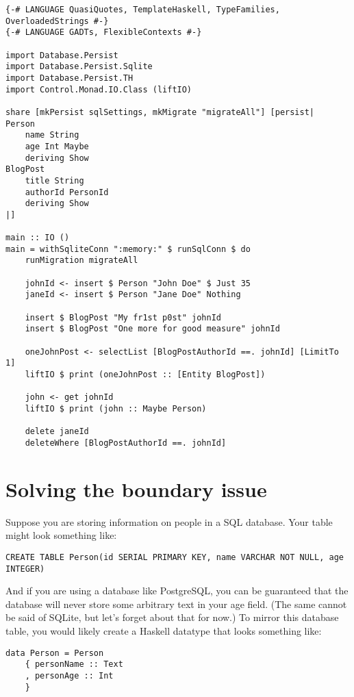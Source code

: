 \begin{lstlisting}
{-# LANGUAGE QuasiQuotes, TemplateHaskell, TypeFamilies, OverloadedStrings #-}
{-# LANGUAGE GADTs, FlexibleContexts #-}

import Database.Persist
import Database.Persist.Sqlite
import Database.Persist.TH
import Control.Monad.IO.Class (liftIO)

share [mkPersist sqlSettings, mkMigrate "migrateAll"] [persist|
Person
    name String
    age Int Maybe
    deriving Show
BlogPost
    title String
    authorId PersonId
    deriving Show
|]

main :: IO ()
main = withSqliteConn ":memory:" $ runSqlConn $ do
    runMigration migrateAll

    johnId <- insert $ Person "John Doe" $ Just 35
    janeId <- insert $ Person "Jane Doe" Nothing

    insert $ BlogPost "My fr1st p0st" johnId
    insert $ BlogPost "One more for good measure" johnId

    oneJohnPost <- selectList [BlogPostAuthorId ==. johnId] [LimitTo 1]
    liftIO $ print (oneJohnPost :: [Entity BlogPost])

    john <- get johnId
    liftIO $ print (john :: Maybe Person)

    delete janeId
    deleteWhere [BlogPostAuthorId ==. johnId]
\end{lstlisting}

\section{Solving the boundary issue}

Suppose you are storing information on people in a SQL database. Your table might look something like:

\begin{lstlisting}
CREATE TABLE Person(id SERIAL PRIMARY KEY, name VARCHAR NOT NULL, age INTEGER)
\end{lstlisting}

And if you are using a database like PostgreSQL, you can be guaranteed that the database will never store some arbitrary text in your age field. (The same cannot be said of SQLite, but let's forget about that for now.) To mirror this database table, you would likely create a Haskell datatype that looks something like:

\begin{lstlisting}
data Person = Person
    { personName :: Text
    , personAge :: Int
    }
\end{lstlisting}

